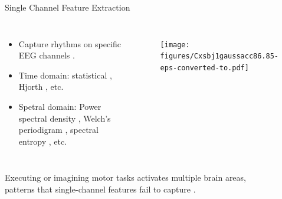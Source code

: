\documentclass[aspectratio=169]{beamer}
\let\oldcite\cite %
\renewcommand{\cite}[1]{{\tiny\oldcite{#1}}}
\begin{document}
\begin{frame}{Single Channel Feature Extraction}
    \begin{columns}
            \begin{itemize}
                \item Capture rhythms on specific EEG channels \cite{samuel2017towards}.
                \item Time domain: statistical \cite{hamedi2014neural}, Hjorth \cite{yilmaz2018quasi}, etc.
                \item Spetral domain: Power spectral density \cite{oikonomou2017comparison}, Welch's periodigram \cite{roy2022comparative}, spectral entropy \cite{sarraf2017eeg}, etc.
            \end{itemize}
            \begin{figure}[!ht]
                \centering
                \texttt{[image: figures/Cxsbj1gaussacc86.85-eps-converted-to.pdf]}
            \end{figure}
    \end{columns}
    \vspace{3em}
    \centering
    Executing or imagining motor tasks activates multiple brain areas,\\patterns that single-channel features fail to capture \cite{chiarion2023connectivity}.
\end{frame}
\end{document}
